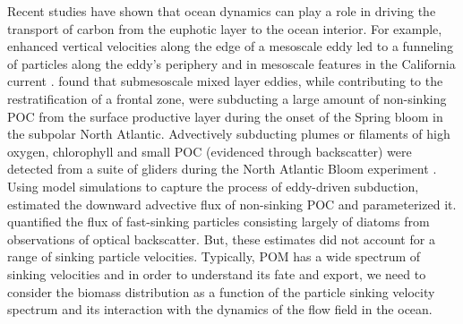 \documentclass[article,linenumbers]{agujournal2019}
\begin{document}
	Recent studies have shown that ocean dynamics can play a role in driving the transport of carbon from the euphotic layer to the ocean interior.  For example, enhanced vertical velocities along the edge of a mesoscale eddy led to a funneling of particles along the eddy's periphery \cite{vanHaren_2006, Waite_2016} and in mesoscale features in the California current \cite{Stukel_2017}.  found that submesoscale mixed layer eddies, while contributing to the restratification of a frontal zone, were subducting a large amount of non-sinking POC from the surface productive layer during the onset of the Spring bloom in the subpolar North Atlantic. Advectively subducting plumes or filaments of high oxygen, chlorophyll and small POC (evidenced through backscatter) were detected from a suite of gliders during the North Atlantic Bloom experiment \cite{Alkire_2012}. Using model simulations to capture the process of eddy-driven subduction,  estimated the downward advective flux of non-sinking POC and parameterized it.  quantified the flux of fast-sinking particles consisting largely of diatoms from observations of optical backscatter. But, these estimates did not account for a range of sinking particle velocities.  Typically, POM has a wide spectrum of sinking velocities and in order to understand its fate and export, we need to consider the biomass distribution as a function of the particle sinking velocity spectrum and its interaction with the dynamics of the flow field in the ocean.
\end{document}
